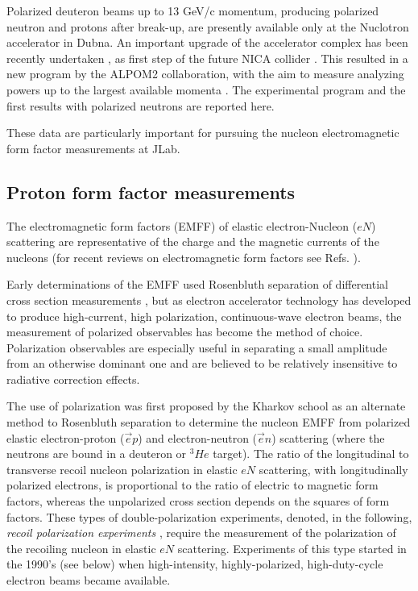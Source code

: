 \documentclass[epj]{svjour}
\begin{document}
Polarized deuteron beams up to 13 GeV/c momentum, producing polarized neutron and protons after break-up, are presently available only  at the Nuclotron accelerator in Dubna. An important upgrade of the accelerator complex has been recently undertaken \cite{Kekelidze:2017ghu}, as first step of the future NICA collider \cite{Kekelidze:2017ual}.
This resulted in a new program by the ALPOM2 collaboration, with the aim to measure analyzing powers up to the largest available momenta  \cite{ALPOM2}. The experimental program and the first results with polarized neutrons are reported here. 

These data are particularly important for pursuing the nucleon electromagnetic form factor measurements at JLab.

\subsection{Proton form factor measurements}
The electromagnetic form factors (EMFF) of elastic electron-Nucleon ($eN$) scattering are representative of the charge and the magnetic currents of the nucleons (for recent reviews on electromagnetic form factors see Refs. \cite{Pacetti:2015iqa,Punjabi:2015bba}).  
 
Early determinations of the EMFF used Rosenbluth separation of differential cross section measurements  \cite{Pacetti:2015iqa}, but as electron accelerator technology has developed to produce high-current, high polarization, continuous-wave electron beams, the measurement of polarized observables has become the method of choice. Polarization observables are especially useful in separating a small amplitude from an otherwise dominant one and are believed to be relatively insensitive to radiative correction effects. 

The use of polarization was first proposed by the Kharkov school \cite{Akhiezer:1968ek,Akhiezer:1974em} as an alternate method to Rosenbluth separation to determine the nucleon EMFF  from  polarized elastic  electron-proton ($\vec e p$) and electron-neutron ($ \vec e n$) scattering (where the neutrons are bound in  a deuteron or $^3\!He$ target). The ratio of the longitudinal to transverse recoil nucleon polarization in elastic $eN$ scattering, with longitudinally polarized electrons, is proportional to the ratio of electric to magnetic form factors, whereas the unpolarized cross section  depends on the squares of form factors. These types of double-polarization experiments,  denoted, in the following, {\it recoil polarization experiments }, require the measurement of the polarization of the recoiling nucleon in elastic $eN$ scattering. Experiments of this type started in the 1990's (see below) when high-intensity, highly-polarized, high-duty-cycle electron beams became available.
\end{document}
